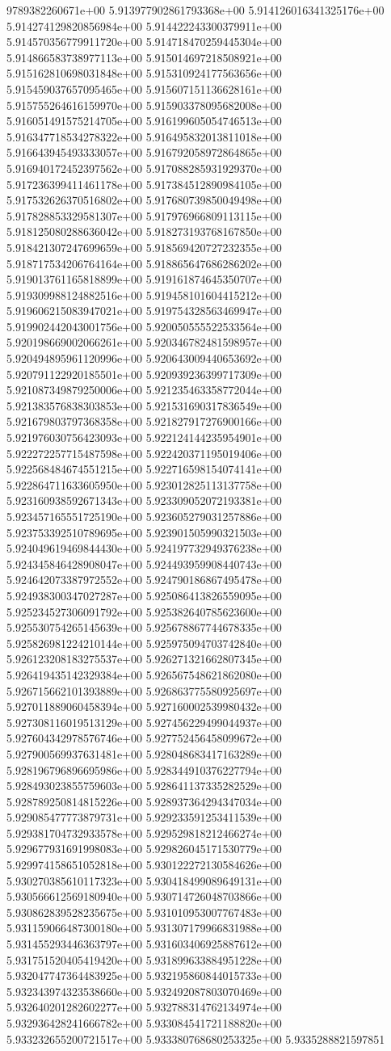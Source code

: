 9789382260671e+00	5.913977902861793368e+00	5.914126016341325176e+00	5.914274129820856984e+00	5.914422243300379911e+00	5.914570356779911720e+00	5.914718470259445304e+00	5.914866583738977113e+00	5.915014697218508921e+00	5.915162810698031848e+00	5.915310924177563656e+00	5.915459037657095465e+00	5.915607151136628161e+00	5.915755264616159970e+00	5.915903378095682008e+00	5.916051491575214705e+00	5.916199605054746513e+00	5.916347718534278322e+00	5.916495832013811018e+00	5.916643945493333057e+00	5.916792058972864865e+00	5.916940172452397562e+00	5.917088285931929370e+00	5.917236399411461178e+00	5.917384512890984105e+00	5.917532626370516802e+00	5.917680739850049498e+00	5.917828853329581307e+00	5.917976966809113115e+00	5.918125080288636042e+00	5.918273193768167850e+00	5.918421307247699659e+00	5.918569420727232355e+00	5.918717534206764164e+00	5.918865647686286202e+00	5.919013761165818899e+00	5.919161874645350707e+00	5.919309988124882516e+00	5.919458101604415212e+00	5.919606215083947021e+00	5.919754328563469947e+00	5.919902442043001756e+00	5.920050555522533564e+00	5.920198669002066261e+00	5.920346782481598957e+00	5.920494895961120996e+00	5.920643009440653692e+00	5.920791122920185501e+00	5.920939236399717309e+00	5.921087349879250006e+00	5.921235463358772044e+00	5.921383576838303853e+00	5.921531690317836549e+00	5.921679803797368358e+00	5.921827917276900166e+00	5.921976030756423093e+00	5.922124144235954901e+00	5.922272257715487598e+00	5.922420371195019406e+00	5.922568484674551215e+00	5.922716598154074141e+00	5.922864711633605950e+00	5.923012825113137758e+00	5.923160938592671343e+00	5.923309052072193381e+00	5.923457165551725190e+00	5.923605279031257886e+00	5.923753392510789695e+00	5.923901505990321503e+00	5.924049619469844430e+00	5.924197732949376238e+00	5.924345846428908047e+00	5.924493959908440743e+00	5.924642073387972552e+00	5.924790186867495478e+00	5.924938300347027287e+00	5.925086413826559095e+00	5.925234527306091792e+00	5.925382640785623600e+00	5.925530754265145639e+00	5.925678867744678335e+00	5.925826981224210144e+00	5.925975094703742840e+00	5.926123208183275537e+00	5.926271321662807345e+00	5.926419435142329384e+00	5.926567548621862080e+00	5.926715662101393889e+00	5.926863775580925697e+00	5.927011889060458394e+00	5.927160002539980432e+00	5.927308116019513129e+00	5.927456229499044937e+00	5.927604342978576746e+00	5.927752456458099672e+00	5.927900569937631481e+00	5.928048683417163289e+00	5.928196796896695986e+00	5.928344910376227794e+00	5.928493023855759603e+00	5.928641137335282529e+00	5.928789250814815226e+00	5.928937364294347034e+00	5.929085477773879731e+00	5.929233591253411539e+00	5.929381704732933578e+00	5.929529818212466274e+00	5.929677931691998083e+00	5.929826045171530779e+00	5.929974158651052818e+00	5.930122272130584626e+00	5.930270385610117323e+00	5.930418499089649131e+00	5.930566612569180940e+00	5.930714726048703866e+00	5.930862839528235675e+00	5.931010953007767483e+00	5.931159066487300180e+00	5.931307179966831988e+00	5.931455293446363797e+00	5.931603406925887612e+00	5.931751520405419420e+00	5.931899633884951228e+00	5.932047747364483925e+00	5.932195860844015733e+00	5.932343974323538660e+00	5.932492087803070469e+00	5.932640201282602277e+00	5.932788314762134974e+00	5.932936428241666782e+00	5.933084541721188820e+00	5.933232655200721517e+00	5.933380768680253325e+00	5.9335288821597851